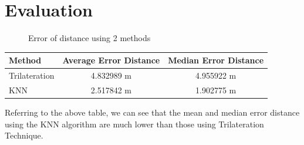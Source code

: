 \documentclass[12pt, conference]{IEEEtran}
\begin{document}
\section{Evaluation}
\begin{figure}[htbp]
  \centering
  \caption{Error of distance using 2 methods}
  \label{fig: Comparison}
\end{figure}

\begin{table}[htbp]
  \begin{tabular}{|l|c|c|}
  \hline
  Method        & Average Error Distance & Median Error Distance \\ \hline
  Trilateration & 4.832989 m             & 4.955922 m            \\ \hline
  KNN           & 2.517842 m             & 1.902775 m            \\ \hline
  \end{tabular}
\end{table}

Referring to the above table, we can see that the mean and median error distance using the KNN algorithm are much lower than those using Trilateration Technique.

\end{document}
